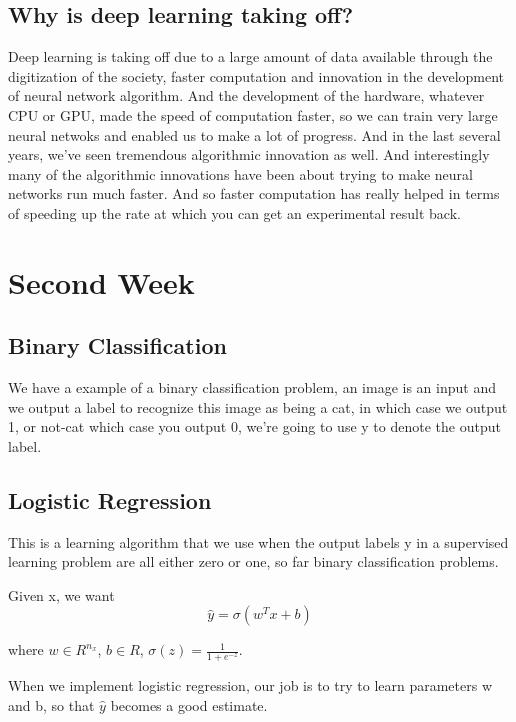 \documentclass[a4paper]{article}
\begin{document}
\subsection{Why is deep learning taking off? }
 \par Deep learning is taking off due to a large amount of data available through the digitization of the society, faster computation and innovation in the development of neural network algorithm. And the development of the hardware, whatever CPU or GPU, made the speed of computation faster, so we can train very large neural netwoks and enabled us to make a lot of progress. And in the last several years, we've seen tremendous algorithmic innovation as well. And interestingly many of the algorithmic innovations have been about trying to make neural networks run much faster. And so faster computation has really helped in terms of speeding up the rate at which you can get an experimental result back.
 
 \section{Second Week}
\subsection{Binary Classification} 
\par We have a example of a binary classification problem, an image is an input and we output a label to recognize this image as being a cat, in which case we output 1, or not-cat which case you output 0, we're going to use y to denote the output label.
\subsection{Logistic Regression}
\par This is a learning algorithm that we use when the output labels y in a supervised learning problem are all either zero or one, so far binary classification problems.
\par Given x, we want
\begin{equation}
\hat{y} = \sigma(w^{T}x+b)
\end{equation}
\par where $w \in R^{n_{x}}$, $b \in R$, $\sigma(z) = \frac{1}{1+e^{-z}}$.
\par When we implement logistic regression, our job is to try to learn parameters w and b, so that $\hat{y}$ becomes a good estimate.
\end{document}
